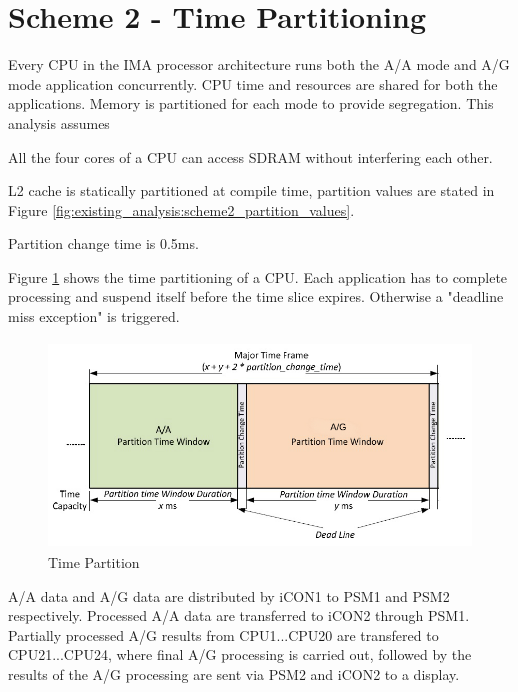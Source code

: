 \clearpage
\section{Scheme 2 - Time Partitioning}
\label{sec:scheme2}
Every CPU in the IMA processor architecture runs both the A/A mode and A/G mode application concurrently. CPU time and resources are shared for both the applications. Memory is partitioned for each mode to provide segregation. This analysis assumes
\begin{compactitem}
	\item All the four cores of a CPU can access SDRAM without interfering each other.
	\item L2 cache is statically partitioned at compile time, partition values are stated in Figure \ref{fig:existing_analysis:scheme2_partition_values}.
	\item Partition change time is 0.5ms. 
\end{compactitem} 

Figure \ref{fig:existing_analysis:scheme2_partition} shows the time partitioning of a CPU. Each application has to complete processing and suspend itself before the time slice expires. Otherwise a "deadline miss exception" is triggered.

\begin{figure}[h!]
	\centering
	\includegraphics[height=55mm]{figures/scheme2_partition}
	\caption{Time Partition}
	\label{fig:existing_analysis:scheme2_partition}
\end{figure}

A/A data and A/G data are distributed by iCON1 to PSM1 and PSM2 respectively. Processed A/A data are transferred to iCON2 through PSM1. Partially processed A/G results from CPU1...CPU20 are transfered to CPU21...CPU24, where final A/G processing is carried out, followed by the results of the A/G processing are sent via PSM2 and iCON2 to a display.


